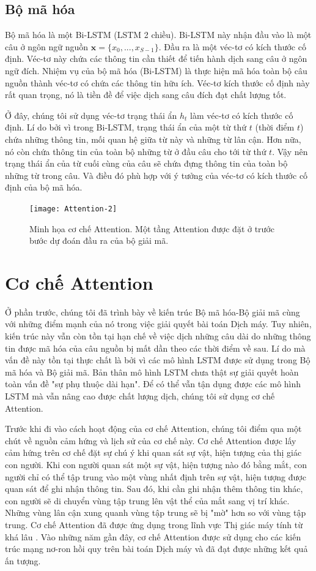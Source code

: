 \subsection{Bộ mã hóa}
Bộ mã hóa là một Bi-LSTM (LSTM 2 chiều). Bi-LSTM này nhận đầu vào là một câu ở ngôn ngữ nguồn $\bm{x} = \{x_0, ..., x_{S-1}\}$. Đầu ra là một véc-tơ có kích thước cố định. Véc-tơ này chứa các thông tin cần thiết để tiến hành dịch sang câu ở ngôn ngữ đích. Nhiệm vụ của bộ mã hóa (Bi-LSTM) là thực hiện mã hóa toàn bộ câu nguồn thành véc-tơ có chứa các thông tin hữu ích. Véc-tơ kích thước cố định này rất quan trọng, nó là tiền đề để việc dịch sang câu đích đạt chất lượng tốt.

Ở đây, chúng tôi sử dụng véc-tơ trạng thái ẩn $h_t$ làm véc-tơ có kích thước cố định. Lí do bởi vì trong Bi-LSTM, trạng thái ẩn của một từ thứ $t$ (thời điểm $t$) chứa những thông tin, mối quan hệ giữa từ này và những từ lân cận. Hơn nữa, nó còn chứa thông tin của toàn bộ những từ ở đầu câu cho tới từ thứ $t$. Vậy nên trạng thái ẩn của từ cuối cùng của câu sẽ chứa đựng thông tin của toàn bộ những từ trong câu. Và điều đó phù hợp với ý tưởng của véc-tơ có kích thước cố định của bộ mã hóa.

\begin{figure}
	\centering
	\texttt{[image: Attention-2]}
	\caption[Minh họa cơ chế Attention.]{Minh họa cơ chế Attention. Một tầng Attention được đặt ở trước bước dự đoán đầu ra của bộ giải mã.}
	\label{fig_Encoder}
\end{figure}


\section{Cơ chế Attention}
Ở phần trước, chúng tôi đã trình bày về kiến trúc Bộ mã hóa-Bộ giải mã cùng với những điểm mạnh của nó trong việc giải quyết bài toán Dịch máy. Tuy nhiên, kiến trúc này vẫn còn tồn tại hạn chế về việc dịch những câu dài do những thông tin được mã hóa của câu nguồn bị mất dần theo các thời điểm về sau. Lí do mà vấn đề này tồn tại thực chất là bởi vì các mô hình LSTM được sử dụng trong Bộ mã hóa và Bộ giải mã. Bản thân mô hình LSTM chưa thật sự giải quyết hoàn toàn vấn đề "sự phụ thuộc dài hạn". Để có thể vẫn tận dụng được các mô hình LSTM mà vẫn nâng cao được chất lượng dịch, chúng tôi sử dụng cơ chế Attention.

Trước khi đi vào cách hoạt động của cơ chế Attention, chúng tôi điểm qua một chút về nguồn cảm hứng và lịch sử của cơ chế này. Cơ chế Attention được lấy cảm hứng trên cơ chế đặt sự chú ý khi quan sát sự vật, hiện tượng của thị giác con người. Khi con người quan sát một sự vật, hiện tượng nào đó bằng mắt, con người chỉ có thể tập trung vào một vùng nhất định trên sự vật, hiện tượng được quan sát để ghi nhận thông tin. Sau đó, khi cần ghi nhận thêm thông tin khác, con người sẽ di chuyển vùng tập trung lên vật thể của mắt sang vị trí khác. Những vùng lân cận xung quanh vùng tập trung sẽ bị "mờ" hơn so với vùng tập trung. Cơ chế Attention đã được ứng dụng trong lĩnh vực Thị giác máy tính từ khá lâu \cite{attentionhistory2010} \cite{attentionhistory2011}. Vào những năm gần đây, cơ chế Attention được sử dụng cho các kiến trúc mạng nơ-ron hồi quy trên bài toán Dịch máy và đã đạt được những kết quả ấn tượng.

